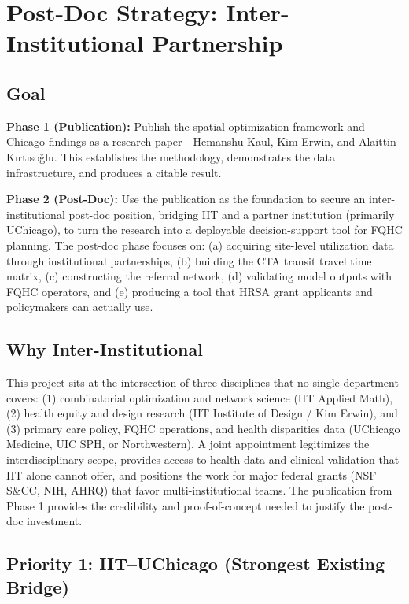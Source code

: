 \documentclass[11pt]{article}
\begin{document}
\section*{Post-Doc Strategy: Inter-Institutional Partnership}

\subsection*{Goal}

\textbf{Phase 1 (Publication):} Publish the spatial optimization framework and Chicago findings as a research paper---Hemanshu Kaul, Kim Erwin, and Alaittin K{\i}rt{\i}so\u{g}lu. This establishes the methodology, demonstrates the data infrastructure, and produces a citable result.

\textbf{Phase 2 (Post-Doc):} Use the publication as the foundation to secure an inter-institutional post-doc position, bridging IIT and a partner institution (primarily UChicago), to turn the research into a deployable decision-support tool for FQHC planning. The post-doc phase focuses on: (a) acquiring site-level utilization data through institutional partnerships, (b) building the CTA transit travel time matrix, (c) constructing the referral network, (d) validating model outputs with FQHC operators, and (e) producing a tool that HRSA grant applicants and policymakers can actually use.

\subsection*{Why Inter-Institutional}

This project sits at the intersection of three disciplines that no single department covers: (1) combinatorial optimization and network science (IIT Applied Math), (2) health equity and design research (IIT Institute of Design / Kim Erwin), and (3) primary care policy, FQHC operations, and health disparities data (UChicago Medicine, UIC SPH, or Northwestern). A joint appointment legitimizes the interdisciplinary scope, provides access to health data and clinical validation that IIT alone cannot offer, and positions the work for major federal grants (NSF S\&CC, NIH, AHRQ) that favor multi-institutional teams. The publication from Phase 1 provides the credibility and proof-of-concept needed to justify the post-doc investment.

\subsection*{Priority 1: IIT--UChicago (Strongest Existing Bridge)}
\end{document}
